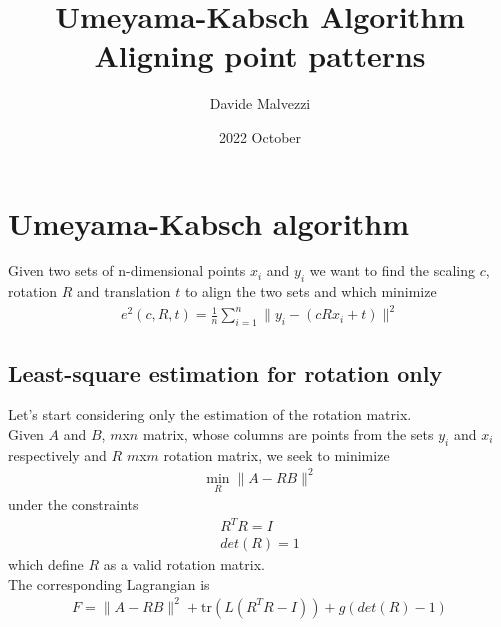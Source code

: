 \documentclass{report}
\title{Umeyama-Kabsch Algorithm \cite{88573} \\
       \large Aligning point patterns
}
\date{2022 October}
\author{Davide Malvezzi}
\begin{document}
\maketitle
\section{Umeyama-Kabsch algorithm}
Given two sets of n-dimensional points $x_i$ and $y_i$ we want to find the scaling $c$, rotation $R$ and translation $t$ 
to align the two sets and which minimize 
\begin{align}
    e^2(c, R, t) = \frac{1}{n}\sum_{i=1}^{n}\lVert y_i - (cRx_i+t) \rVert^2
\end{align}
\subsection{Least-square estimation for rotation only}
Let's start considering only the estimation of the rotation matrix. \\
Given $A$ and $B$, $m$x$n$ matrix, whose columns are points from the sets $y_i$ and $x_i$ respectively and $R$ $m$x$m$ rotation matrix, 
we seek to minimize
\begin{align}
    \min_R \lVert A - R B \rVert^2 \label{eqn:rotation_only}
\end{align}
under the constraints
\begin{align}
    R^TR=I  \\
    det(R)=1
\end{align}
which define $R$ as a valid rotation matrix. \\
The corresponding Lagrangian is
\begin{align}
    F = \lVert A - R B \rVert^2 + \text{tr}(L(R^TR - I)) + g(det(R) - 1)
\end{align}
\end{document}
